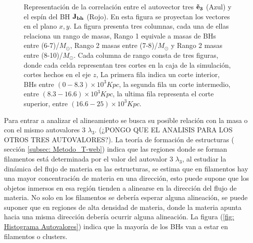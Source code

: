 \begin{figure}
\caption{Representación de la correlación entre el autovector tres ${\bf{\vec{e}}_{3}}$ (Azul) y el espín del BH ${\bf{J_{bh}}}$ (Rojo). En esta figura se proyectan los vectores en el plano $x,y$. La figura presenta tres columnas, cada una de ellas relaciona un rango de masas, Rango 1 equivale a masas de BHs entre (6-7)/$M_{\odot}$, Rango 2 masas entre (7-8)/$M_{\odot}$ y Rango 2 masas entre (8-10)/$M_{\odot}$. Cada columna de rango consta de tres figuras, donde cada celda  representan tres cortes en la caja de la simulación, cortes hechos en el eje $z$, La primera fila indica un corte interior, BHs entre $(0-8.3)\times10^{3} Kpc$,  la segunda fila un corte intermedio, entre $(8.3-16.6)\times10^{3} Kpc$, la ultima fila representa el corte superior, entre  $ (16.6-25)\times10^{3} Kpc$. } 
\label{fig: proyeccion espines} 
\end{figure}

Para entrar a analizar el alineamiento se busca su posible relación con la masa o con el mismo autovalores 3 $\lambda_{3}$. (¿PONGO QUE EL ANALISIS PARA LOS OTROS TRES AUTOVALORES?). La teoría de formación de estructuras ( sección \ref{subsec: Metodo_T-web}) indica que las regiones donde se forman filamentos está determinada por el valor del autovalor 3 $\lambda_{3}$, al estudiar la dinámica del flujo de materia en las estructuras, se estima  que en filamentos hay una mayor concentración de materia en una dirección, esto puede  supone que los objetos inmersos en esa región tienden a alinearse en la dirección del flujo de materia. No solo en los filamentos se debería esperar alguna alineación, se puede suponer que en regiones de alta densidad de materia, donde la materia apunta hacia una misma dirección debería ocurrir alguna alineación. La figura (\ref{fig: Histograma Autovalores}) indica que la mayoría de los BHs van a estar en filamentos o clusters. 

